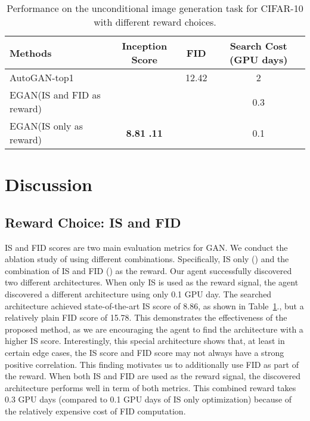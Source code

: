 \documentclass[runningheads]{llncs}
\begin{document}
\begin{table}[b!]
\begin{center}
\begin{tabular}{l|c|c|c}
Methods&Inception Score&FID&Search Cost (GPU days)\\
\hline
AutoGAN-top1~\cite{gong2019autogan}&   &12.42&2\\
\hline
EGAN(IS and FID as reward)  & &&0.3\\
\hline
EGAN(IS only as reward)  & \textbf{8.81}  \textbf{.11} &&0.1\\

\end{tabular}
\end{center}
\caption{Performance on the unconditional image generation task for CIFAR-10 with different reward choices.}
\label{rdr}
\end{table}
\section{Discussion} \label{AS}
\subsection{Reward Choice: IS and FID}
IS and FID scores are two main evaluation metrics for GAN. We conduct the ablation study of using different combinations. Specifically, IS only () and the combination of IS and FID () as the reward. Our agent successfully discovered two different architectures. When only IS is used as the reward signal, the agent discovered a different architecture using only 0.1 GPU day. The searched architecture achieved state-of-the-art IS score of 8.86, as shown in Table~\ref{rdr}., but a relatively plain FID score of 15.78. This demonstrates the effectiveness of the proposed method, as we are encouraging the agent to find the architecture with a higher IS score. Interestingly, this special architecture shows that, at least in certain edge cases, the IS score and FID score may not always have a strong positive correlation. This finding motivates us to additionally use FID as part of the reward. When both IS and FID are used as the reward signal, the discovered architecture performs well in term of both 
metrics. This combined reward takes 0.3 GPU days (compared to 0.1 GPU days of IS only optimization) because of the relatively expensive cost of FID computation. 
\end{document}
